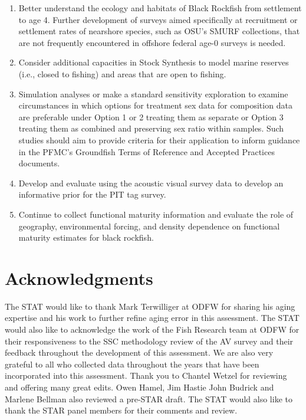 \documentclass[11pt,
  english,
  letterpaper,
]{article}
\begin{document}
\begin{enumerate}
\item
  Better understand the ecology and habitats of Black Rockfish from settlement to age 4. Further development of surveys aimed specifically at recruitment or settlement rates of nearshore species, such as OSU's SMURF collections, that are not frequently encountered in offshore federal age-0 surveys is needed.
\item
  Consider additional capacities in Stock Synthesis to model marine reserves (i.e., closed to fishing) and areas that are open to fishing.
\item
  Simulation analyses or make a standard sensitivity exploration to examine circumstances in which options for treatment sex data for composition data are preferable under Option 1 or 2 treating them as separate or Option 3 treating them as combined and preserving sex ratio within samples. Such studies should aim to provide criteria for their application to inform guidance in the PFMC's Groundfish Terms of Reference and Accepted Practices documents.
\item
  Develop and evaluate using the acoustic visual survey data to develop an informative prior for the PIT tag survey.
\item
  Continue to collect functional maturity information and evaluate the role of geography, environmental forcing, and density dependence on functional maturity estimates for black rockfish.
\end{enumerate}

\hypertarget{acknowledgments}{%
\section{Acknowledgments}\label{acknowledgments}}

The STAT would like to thank Mark Terwilliger at ODFW for sharing his aging expertise and his work to further refine aging error in this assessment. The STAT would also like to acknowledge the work of the Fish Research team at ODFW for their responsiveness to the SSC methodology review of the AV survey and their feedback throughout the development of this assessment. We are also very grateful to all who collected data throughout the years that have been incorporated into this assessment. Thank you to Chantel Wetzel for reviewing and offering many great edits. Owen Hamel, Jim Hastie John Budrick and Marlene Bellman also reviewed a pre-STAR draft. The STAT would also like to thank the STAR panel members for their comments and review.
\end{document}
